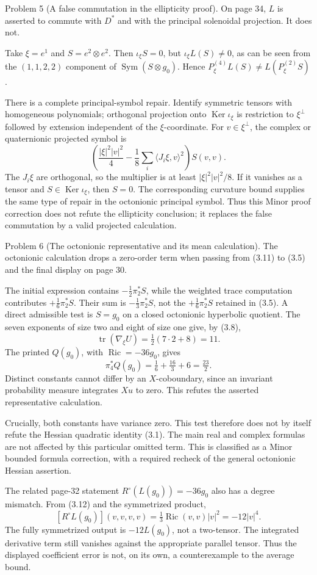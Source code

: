 \documentclass[10pt]{article}
\begin{document}
Problem 5 (A false commutation in the ellipticity proof).  On page 34, \(L\) is asserted to commute with \(D^*\) and with the principal solenoidal projection. It does not.\par
Take \(\xi=e^1\) and \(S=e^2\otimes e^2\). Then \(\iota_\xi S=0\), but \(\iota_\xi L(S)\ne0\), as can be seen from the \((1,1,2,2)\) component of \(\operatorname{Sym}(S\otimes g_0)\). Hence \(P_\xi^{(4)}L(S)\ne L(P_\xi^{(2)}S)\).\par
There is a complete principal-symbol repair. Identify symmetric tensors with homogeneous polynomials; orthogonal projection onto \(\operatorname{Ker}\iota_\xi\) is restriction to \(\xi^\perp\) followed by extension independent of the \(\xi\)-coordinate. For \(v\in\xi^\perp\), the complex or quaternionic projected symbol is \[\left(\frac{|\xi|^2|v|^2}{4}
       -\frac18\sum_i\langle J_i\xi,v\rangle^2\right)S(v,v).\] The \(J_i\xi\) are orthogonal, so the multiplier is at least \(|\xi|^2|v|^2/8\). If it vanishes as a tensor and \(S\in\operatorname{Ker}\iota_\xi\), then \(S=0\). The corresponding curvature bound supplies the same type of repair in the octonionic principal symbol. Thus this Minor proof correction does not refute the ellipticity conclusion; it replaces the false commutation by a valid projected calculation.\par
Problem 6 (The octonionic representative and its mean calculation).  The octonionic calculation drops a zero-order term when passing from (3.11) to (3.5) and the final display on page 30.\par
The initial expression contains \(-\tfrac12\pi_2^*S\), while the weighted trace computation contributes \(+\tfrac16\pi_2^*S\). Their sum is \(-\tfrac13\pi_2^*S\), not the \(+\tfrac16\pi_2^*S\) retained in (3.5). A direct admissible test is \(S=g_0\) on a closed octonionic hyperbolic quotient. The seven exponents of size two and eight of size one give, by (3.8), \[\operatorname{tr}(\nabla_\xi U)=\tfrac12(7\cdot2+8)=11.\] The printed \(Q(g_0)\), with \(\operatorname{Ric}=-36g_0\), gives \[\pi_4^*Q(g_0)=\tfrac16+\tfrac{16}{3}+6
             =\tfrac{23}{2}.\] Distinct constants cannot differ by an \(X\)-coboundary, since an invariant probability measure integrates \(Xu\) to zero. This refutes the asserted representative calculation.\par
Crucially, both constants have variance zero. This test therefore does not by itself refute the Hessian quadratic identity (3.1). The main real and complex formulas are not affected by this particular omitted term. This is classified as a Minor bounded formula correction, with a required recheck of the general octonionic Hessian assertion.\par
The related page-32 statement \(R^\circ(L(g_0))=-36g_0\) also has a degree mismatch. From (3.12) and the symmetrized product, \[[R^\circ L(g_0)](v,v,v,v)
   =\tfrac13\operatorname{Ric}(v,v)|v|^2=-12|v|^4.\] The fully symmetrized output is \(-12L(g_0)\), not a two-tensor. The integrated derivative term still vanishes against the appropriate parallel tensor. Thus the displayed coefficient error is not, on its own, a counterexample to the average bound.\par
\end{document}
